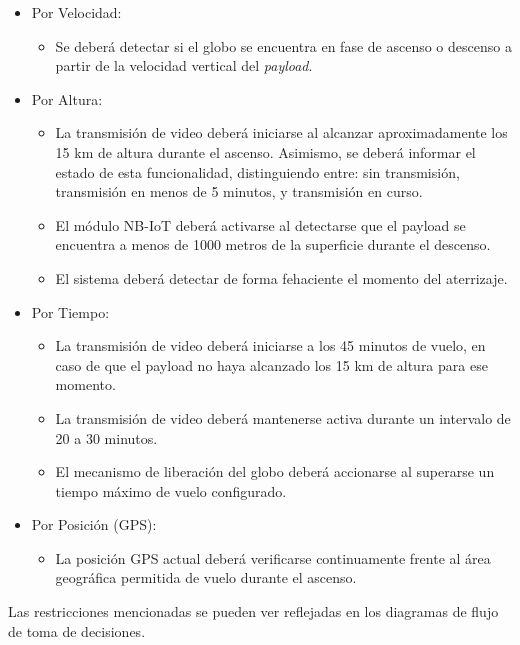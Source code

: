 \documentclass[12pt,a4paper]{article}
\begin{document}
\begin{itemize}
\item
  Por Velocidad:

  \begin{itemize}
  \item
    Se deberá detectar si el globo se encuentra en fase de ascenso o descenso a partir de la velocidad vertical del \emph{payload}.
  \end{itemize}
\item
  Por Altura:

  \begin{itemize}
  \item
    La transmisión de video deberá iniciarse al alcanzar aproximadamente los 15 km de altura durante el ascenso. Asimismo, se deberá informar el estado de esta funcionalidad, distinguiendo entre: sin transmisión, transmisión en menos de 5 minutos, y transmisión en curso.
  \item
    El módulo NB-IoT deberá activarse al detectarse que el payload se encuentra a menos de 1000 metros de la superficie durante el descenso.
  \item
    El sistema deberá detectar de forma fehaciente el momento del aterrizaje.
  \end{itemize}
\item
  Por Tiempo:

  \begin{itemize}
  \item
    La transmisión de video deberá iniciarse a los 45 minutos de vuelo, en caso de que el payload no haya alcanzado los 15 km de altura para ese momento.
  \item
    La transmisión de video deberá mantenerse activa durante un intervalo de 20 a 30 minutos.
  \item
    El mecanismo de liberación del globo deberá accionarse al superarse un tiempo máximo de vuelo configurado.
  \end{itemize}
\item
  Por Posición (GPS):

  \begin{itemize}
  \item
    La posición GPS actual deberá verificarse continuamente frente al área geográfica permitida de vuelo durante el ascenso.
  \end{itemize}
\end{itemize}

Las restricciones mencionadas se pueden ver reflejadas en los diagramas de flujo de toma de decisiones.
\end{document}
